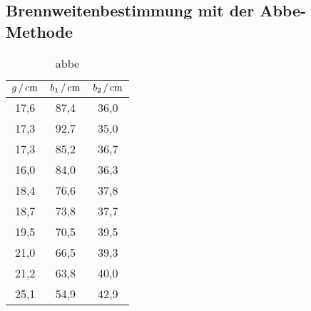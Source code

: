 \subsection{Brennweitenbestimmung mit der Abbe-Methode}
\begin{table}
  \caption{abbe}
  \label{tab:abbe}
  \begin{tabular}{ccc}
    \toprule
    $g\,/\,\si{\centi\meter}$ & $b_1\,/\,\si{\centi\meter}$ & $b_2\,/\,\si{\centi\meter}$ \\
    \midrule
    17,6 & 87,4 & 36,0 \\
    17,3 & 92,7 & 35,0 \\
    17,3 & 85,2 & 36,7 \\
    16,0 & 84,0 & 36,3 \\
    18,4 & 76,6 & 37,8 \\
    18,7 & 73,8 & 37,7 \\
    19,5 & 70,5 & 39,5 \\
    21,0 & 66,5 & 39,3 \\
    21,2 & 63,8 & 40,0 \\
    25,1 & 54,9 & 42,9 \\
  \end{tabular}
\end{table}
